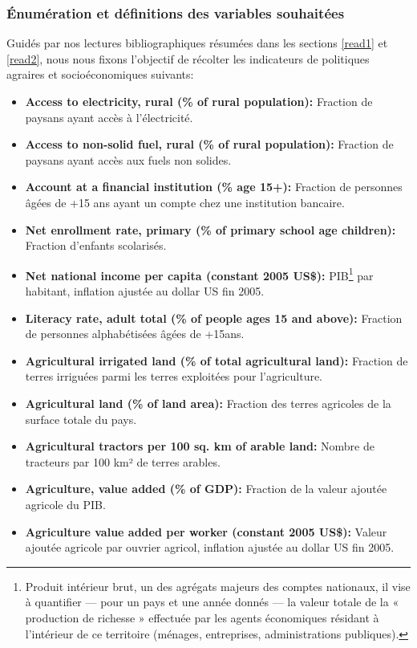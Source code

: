 	\subsubsection{Énumération et définitions des variables souhaitées }\label{exoList}
			Guidés par nos lectures bibliographiques résumées dans les sections \ref{read1} et \ref{read2}, nous nous fixons l'objectif de récolter les indicateurs de politiques agraires et socioéconomiques suivants:
	\begin{itemize}
		\item \textbf{ Access to electricity, rural (\% of rural population):} Fraction de paysans ayant accès à l'électricité.
		\item \textbf{ Access to non-solid fuel, rural (\% of rural population):} Fraction de paysans ayant accès aux fuels non solides.
		\item \textbf{ Account at a financial institution (\% age 15+):} Fraction de personnes âgées de +15 ans ayant un compte chez une institution bancaire.
		\item \textbf{ Net enrollment rate, primary (\% of primary school age children):} Fraction d'enfants scolarisés.
		\item \textbf{ Net national income per capita (constant 2005 US\$):} PIB\footnote{Produit intérieur brut, un des agrégats majeurs des comptes nationaux, il vise à quantifier — pour un pays et une année donnés — la valeur totale de la « production de richesse » effectuée par les agents économiques résidant à l’intérieur de ce territoire (ménages, entreprises, administrations publiques).} par habitant, inflation ajustée au dollar US fin 2005.
		\item \textbf{ Literacy rate, adult total (\% of people ages 15 and above):} Fraction de personnes alphabétisées âgées de +15ans.
		\item \textbf{ Agricultural irrigated land (\% of total agricultural land):} Fraction de terres irriguées parmi les terres exploitées pour l'agriculture.
		\item \textbf{ Agricultural land (\% of land area):} Fraction des terres agricoles de la surface totale du pays.
		\item \textbf{ Agricultural tractors per 100 sq. km of arable land:} Nombre de tracteurs par 100 km² de terres arables.
		\item \textbf{ Agriculture, value added (\% of GDP):} Fraction de la valeur ajoutée agricole du PIB.
		\item \textbf{ Agriculture value added per worker (constant 2005 US\$):} Valeur ajoutée agricole par ouvrier agricol, inflation ajustée au dollar US fin 2005.

\end{itemize}
